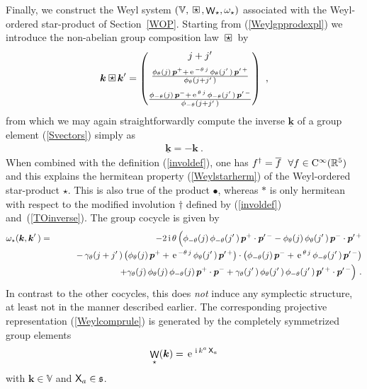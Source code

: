 \documentclass[11pt,a4paper]{article}
\DeclareMathOperator{\weyl}{{\sf W}}                   %
\newcommand{\compc}{\mkern+4mu\square\mkern-17.4mu{\mbox{
    \protect\raisebox{0.2ex}{$\star$}}\mkern+5mu}}      %
\newcommand{\1}{\mathbb{1}}
\newcommand{\mbf}[1]{{\boldsymbol {#1} }}
\def\ii{{\,{\rm i}\,}}
\def\CC{{\rm C}}
\def\X{{\sf X}}
\def\mk{{\mbf k}}
\def\mbp{{\mbf p}}
\def\mfs{{\mathfrak s}}
\def\mbbV{{\mathbb V}}
\newcommand{\real}{{\mathbb R}} %
\def\e{{\,\rm e}\,}
\def\bea{\begin{eqnarray}}
\def\eea{\end{eqnarray}}
\newcommand{\beq}{\begin{eqnarray}}
\newcommand{\eeq}{\end{eqnarray}}
\begin{document}
Finally, we construct the Weyl system
$(\mbbV,\compc,\weyl_\star,\omega_\star)$ associated with the
Weyl-ordered star-product of Section~\ref{WOP}. Starting from
(\ref{Weylgpprodexpl}) we introduce the non-abelian group composition
law $\compc$ by
\beq
\mk\compc\mk'=\begin{pmatrix}j+j'\,\\[2mm]
\frac{\phi_\theta(j)\,\mbp^++
\e^{-\theta\,j}\,\phi_\theta(j'\,)\,\mbp^{\prime\,+}}
{\phi_\theta(j+j'\,)}\\[3mm]
\frac{\phi_{-\theta}(j)\,\mbp^-+
\e^{\theta\,j}\,\phi_{-\theta}(j'\,)\,\mbp^{\prime\,-}}
{\phi_{-\theta}(j+j'\,)}\end{pmatrix} \ ,
\label{Weylcomplaw}\eeq
from which we may again straightforwardly compute the inverse
$\underline{\mk}$ of a group element (\ref{Svectors}) simply as
\beq
\underline{\mk}=-\mk \ .
\label{Weylinverse}\eeq
When combined with the definition (\ref{involdef}), one has
$f^\dag=\overline{f}~~\forall f\in\CC^\infty(\real^5)$ and this
explains the hermitean property (\ref{Weylstarherm}) of the
Weyl-ordered star-product $\star$. This is also true of the product
$\bullet$, whereas $*$ is only hermitean with respect to the modified
involution $\dag$ defined by (\ref{involdef})
and~(\ref{TOinverse}). The group cocycle is given by
\bea
\omega_\star(\mk,\mk'\,)&=&-2\ii\theta\,\Bigl(
\phi_{-\theta}(j)\,\phi_{-\theta}(j'\,)\,
\mbp^+\cdot\mbp^{\prime\,-}-\phi_{\theta}(j)\,\phi_{\theta}(j'\,)\,
\mbp^-\cdot\mbp^{\prime\,+}\Bigr.\nonumber\\ &&\qquad
-\,\gamma_\theta(j+j'\,)\,\bigl(\phi_\theta(j)\,
\mbp^++\e^{-\theta\,j}\,\phi_\theta(j'\,)\,\mbp^{\prime\,+}\bigr)
\cdot\bigl(\phi_{-\theta}(j)\,
\mbp^-+\e^{\theta\,j}\,\phi_{-\theta}(j'\,)\,
\mbp^{\prime\,-}\bigr)\nonumber\\ &&
\qquad+\Bigl.
\gamma_\theta(j)\,\phi_\theta(j)\,\phi_{-\theta}(j)\,\mbp^+\cdot\mbp^-+
\gamma_\theta(j'\,)\,\phi_\theta(j'\,)\,\phi_{-\theta}(j'\,)\,
\mbp^{\prime\,+}\cdot\mbp^{\prime\,-}
\Bigr) \ .
\label{Weylcocycle}\eea
In contrast to the other cocycles, this does {\it not} induce any
symplectic structure, at least not in the manner described
earlier. The corresponding projective representation
(\ref{Weylcomprule}) is generated by the completely symmetrized group
elements
\beq
\weyl_\star(\mk)=\e^{\ii k^a\,\X_a}
\label{Weylweylop}\eeq
with $\mk\in\mbbV$ and $\X_a\in\mfs$.
\end{document}
